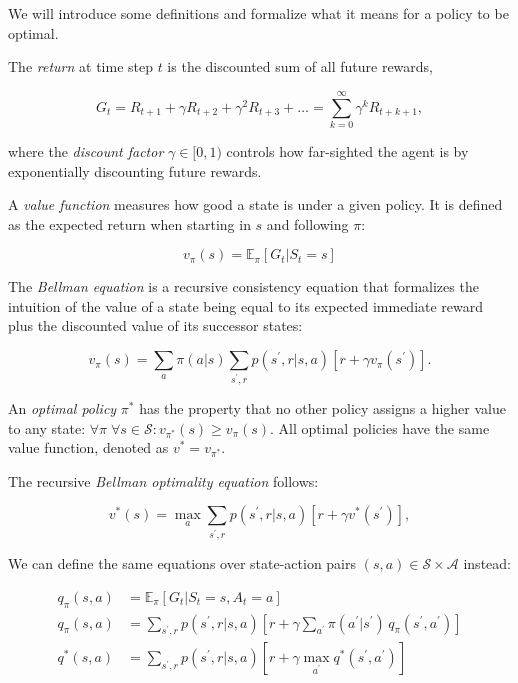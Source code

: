 We will introduce some definitions and formalize what it means for a policy to be optimal.

The \emph{return} at time step $t$ is the discounted sum of all future rewards,

\begin{equation}\label{eq:return}
  G_t=R_{t+1}+\gamma R_{t+2}+\gamma^2 R_{t+3}+\dots=\sum_{k=0}^{\infty}\gamma^k R_{t+k+1},
\end{equation}

where the \emph{discount factor} $\gamma\in[0,1)$ controls how far-sighted the agent is
by exponentially discounting future rewards.

A \emph{value function} measures how good a state is under a given policy.
It is defined as the expected return when starting in $s$ and following $\pi$:

\begin{equation}\label{eq:value-function}
  v_\pi(s)=\mathbb{E}_\pi[G_t|S_t=s]
\end{equation}

The \emph{Bellman equation} is a recursive consistency equation that formalizes the
intuition of the value of a state being equal to its expected immediate reward plus
the discounted value of its successor states:

\begin{equation}\label{eq:bellman-v}
  v_\pi(s)=\sum_a\pi(a|s)\sum_{s^\prime,r}p(s^\prime,r|s,a)\left[r+\gamma v_\pi(s^\prime)\right].
\end{equation}

An \emph{optimal policy} $\pi^*$ has the property that no other policy assigns a
higher value to any state: $\forall\pi\;\forall s\in\mathcal{S}:v_{\pi^*}(s)\geq v_\pi(s)$.
All optimal policies have the same value function, denoted as $v^*=v_{\pi^*}$.

The recursive \emph{Bellman optimality equation} follows:

\begin{equation}\label{eq:bellman-opt}
  v^*(s)=\max_a\sum_{s^\prime,r}p(s^\prime,r|s,a)\left[r+\gamma v^*(s^\prime)\right],
\end{equation}

We can define the same equations over state-action pairs $(s,a)\in\mathcal{S}\times\mathcal{A}$ instead:

\begin{align}
  q_\pi(s,a)&=\mathbb{E}_\pi[G_t|S_t=s,A_t=a]\label{eq:q-function}\\
  q_\pi(s,a)&=\sum_{s^\prime,r}p(s^\prime,r|s,a)\left[r+\gamma\sum_{a^\prime}\pi(a^\prime|s^\prime)\,q_\pi(s^\prime,a^\prime)\right]\label{eq:bellman-q}\\
  q^*(s,a)&=\sum_{s^\prime,r}p(s^\prime,r|s,a)\left[r+\gamma\max_{a^\prime}q^*(s^\prime,a^\prime)\right]\label{eq:bellman-opt-q}
\end{align}


